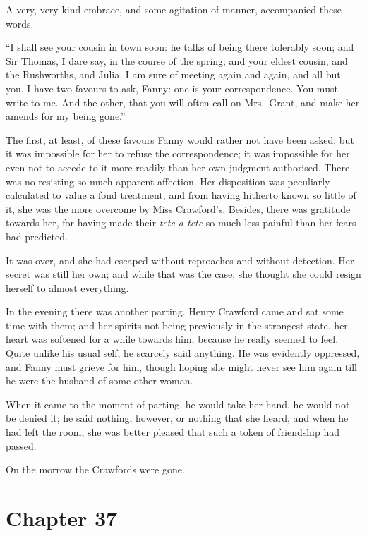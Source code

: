 A very, very kind embrace, and some agitation of manner,
accompanied these words.

``I shall see your cousin in town soon:  he talks of
being there tolerably soon; and Sir Thomas, I dare say,
in the course of the spring; and your eldest cousin,
and the Rushworths, and Julia, I am sure of meeting again
and again, and all but you.  I have two favours to ask,
Fanny:  one is your correspondence.  You must write to me.
And the other, that you will often call on Mrs.\ Grant,
and make her amends for my being gone.''

The first, at least, of these favours Fanny would rather
not have been asked; but it was impossible for her to refuse
the correspondence; it was impossible for her even not to
accede to it more readily than her own judgment authorised.
There was no resisting so much apparent affection.
Her disposition was peculiarly calculated to value a fond
treatment, and from having hitherto known so little of it,
she was the more overcome by Miss Crawford's. Besides,
there was gratitude towards her, for having made their
\emph{tete-a-tete} so much less painful than her fears had predicted.

It was over, and she had escaped without reproaches
and without detection.  Her secret was still her own;
and while that was the case, she thought she could resign
herself to almost everything.

In the evening there was another parting.  Henry Crawford
came and sat some time with them; and her spirits not being
previously in the strongest state, her heart was softened
for a while towards him, because he really seemed to feel.
Quite unlike his usual self, he scarcely said anything.
He was evidently oppressed, and Fanny must grieve for him,
though hoping she might never see him again till he were the
husband of some other woman.

When it came to the moment of parting, he would take her hand,
he would not be denied it; he said nothing, however,
or nothing that she heard, and when he had left the room,
she was better pleased that such a token of friendship
had passed.

On the morrow the Crawfords were gone.



\chapter{Chapter 37}


